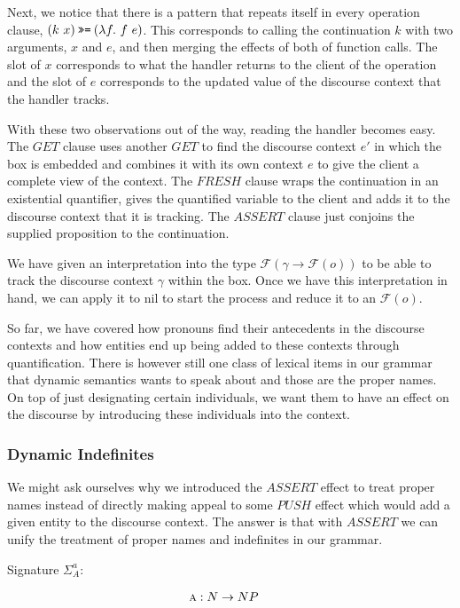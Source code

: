 Next, we notice that there is a pattern that repeats itself in every
operation clause, $(k\ x) \hsbind (\lambda f.\ f\ e)$. This corresponds to
calling the continuation $k$ with two arguments, $x$ and $e$, and then
merging the effects of both of function calls. The slot of $x$ corresponds
to what the handler returns to the client of the operation and the slot of
$e$ corresponds to the updated value of the discourse context that the
handler tracks.

With these two observations out of the way, reading the handler becomes
easy. The $GET$ clause uses another $GET$ to find the discourse context
$e'$ in which the box is embedded and combines it with its own context $e$
to give the client a complete view of the context. The $FRESH$ clause wraps
the continuation in an existential quantifier, gives the quantified
variable to the client and adds it to the discourse context that it is
tracking. The $ASSERT$ clause just conjoins the supplied proposition to the
continuation.

We have given an interpretation into the type $\mathcal{F}(\gamma \to
\mathcal{F}(o))$ to be able to track the discourse context $\gamma$ within
the box. Once we have this interpretation in hand, we can apply it to
$\mathrm{nil}$ to start the process and reduce it to an $\mathcal{F}(o)$.

So far, we have covered how pronouns find their antecedents in the
discourse contexts and how entities end up being added to these contexts
through quantification. There is however still one class of lexical items
in our grammar that dynamic semantics wants to speak about and those are
the proper names. On top of just designating certain individuals, we want
them to have an effect on the discourse by introducing these individuals
into the context.

\subsubsection{Dynamic Indefinites}

We might ask ourselves why we introduced the $ASSERT$ effect to treat
proper names instead of directly making appeal to some $PUSH$ effect which
would add a given entity to the discourse context. The answer is that with
$ASSERT$ we can unify the treatment of proper names and indefinites in our
grammar.

Signature $\Sigma^a_A$:

\begin{align*}
  \textsc{a} &: N \to NP
\end{align*}

